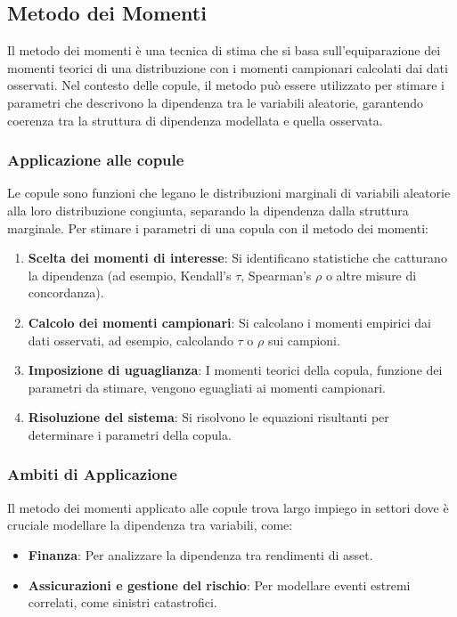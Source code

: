 \documentclass[%
	corpo=11pt,
    twoside,
    stile=classica,
    oldstyle,
    tipotesi=custom,
    greek,
    evenboxes,
]{toptesi}
\begin{document}
\subsection{Metodo dei Momenti}

Il metodo dei momenti è una tecnica di stima che si basa sull’equiparazione dei momenti teorici di una distribuzione con i momenti campionari calcolati dai dati osservati. Nel contesto delle copule, il metodo può essere utilizzato per stimare i parametri che descrivono la dipendenza tra le variabili aleatorie, garantendo coerenza tra la struttura di dipendenza modellata e quella osservata.

\subsubsection{Applicazione alle copule}

Le copule sono funzioni che legano le distribuzioni marginali di variabili aleatorie alla loro distribuzione congiunta, separando la dipendenza dalla struttura marginale. Per stimare i parametri di una copula con il metodo dei momenti:

\begin{enumerate}
	\item \textbf{Scelta dei momenti di interesse}: Si identificano statistiche che catturano la dipendenza (ad esempio, Kendall’s \( \tau \), Spearman’s \( \rho \) o altre misure di concordanza).
	\item \textbf{Calcolo dei momenti campionari}: Si calcolano i momenti empirici dai dati osservati, ad esempio, calcolando \( \tau \) o \( \rho \) sui campioni.
	\item \textbf{Imposizione di uguaglianza}: I momenti teorici della copula, funzione dei parametri da stimare, vengono eguagliati ai momenti campionari.
	\item \textbf{Risoluzione del sistema}: Si risolvono le equazioni risultanti per determinare i parametri della copula.
\end{enumerate}

\subsubsection{Ambiti di Applicazione}

Il metodo dei momenti applicato alle copule trova largo impiego in settori dove è cruciale modellare la dipendenza tra variabili, come:
\begin{itemize}
	\item \textbf{Finanza}: Per analizzare la dipendenza tra rendimenti di asset.
	\item \textbf{Assicurazioni e gestione del rischio}: Per modellare eventi estremi correlati, come sinistri catastrofici.
\end{itemize}
\end{document}
